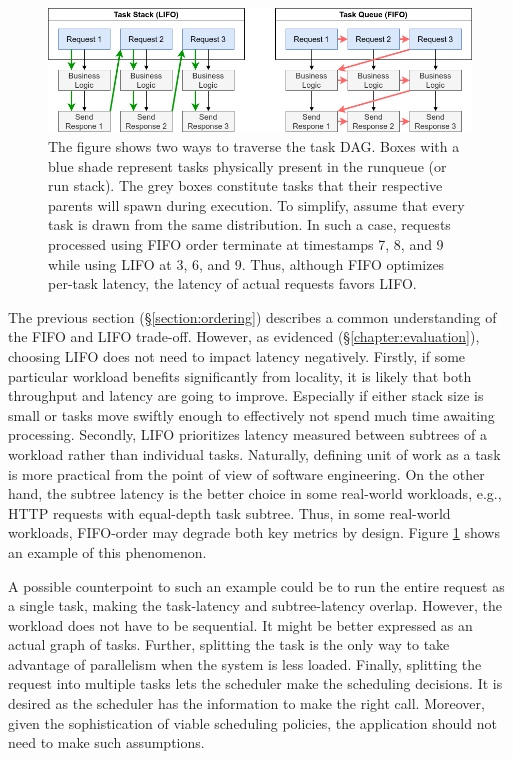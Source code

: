 \documentclass[12pt,a4paper,twoside]{report}
\begin{document}
\begin{figure}
    \centering
    \includegraphics[width=1\textwidth]{FIFOLIFO.png}
    \caption{The figure shows two ways to traverse the task DAG. Boxes with a blue shade represent tasks physically present in the runqueue (or run stack). The grey boxes constitute tasks that their respective parents will spawn during execution. To simplify, assume that every task is drawn from the same distribution. In such a case, requests processed using FIFO order terminate at timestamps 7, 8, and 9 while using LIFO at 3, 6, and 9. Thus, although FIFO optimizes per-task latency, the latency of actual requests favors LIFO.}
   \label{fig:fifo-lifo-latency}
\end{figure}

The previous section (\S\ref{section:ordering}) describes a common understanding of the FIFO and LIFO trade-off. However, as evidenced (\S\ref{chapter:evaluation}), choosing LIFO does not need to impact latency negatively. Firstly, if some particular workload benefits significantly from locality, it is likely that both throughput and latency are going to improve. Especially if either stack size is small or tasks move swiftly enough to effectively not spend much time awaiting processing. Secondly, LIFO prioritizes latency measured between subtrees of a workload rather than individual tasks. Naturally, defining unit of work as a task is more practical from the point of view of software engineering. On the other hand, the subtree latency is the better choice in some real-world workloads, e.g., HTTP requests with equal-depth task subtree. Thus, in some real-world workloads, FIFO-order may degrade both key metrics by design. Figure \ref{fig:fifo-lifo-latency} shows an example of this phenomenon. 

A possible counterpoint to such an example could be to run the entire request as a single task, making the task-latency and subtree-latency overlap. However, the workload does not have to be sequential. It might be better expressed as an actual graph of tasks. Further, splitting the task is the only way to take advantage of parallelism when the system is less loaded. Finally, splitting the request into multiple tasks lets the scheduler make the scheduling decisions. It is desired as the scheduler has the information to make the right call. Moreover, given the sophistication of viable scheduling policies, the application should not need to make such assumptions. 
\end{document}
